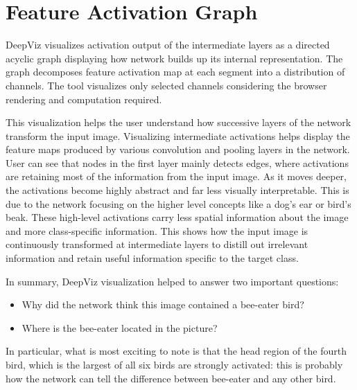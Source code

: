 \clearpage
\section*{Feature Activation Graph}

DeepViz visualizes activation output of the intermediate layers as a directed acyclic graph displaying how network builds up its internal representation. The graph decomposes feature activation map at each segment into a distribution of channels. The tool visualizes only selected channels considering the browser rendering and computation required.

This visualization helps the user understand how successive layers of the network transform the input image. Visualizing intermediate activations helps display the feature maps produced by various convolution and pooling layers in the network. User can see that nodes in the first layer mainly detects edges, where activations are retaining most of the information from the input image. As it moves deeper, the activations become highly abstract and far less visually interpretable. This is due to the network focusing on the higher level concepts like a dog's ear or bird's beak. These high-level activations carry less spatial information about the image and more class-specific information. This shows how the input image is continuously transformed at intermediate layers to distill out irrelevant information and retain useful information specific to the target class.

In summary, DeepViz visualization helped to answer two important questions:
\vspace{-1em}
\begin{itemize}
\item  Why did the network think this image contained a bee-eater bird?
\vspace{-1em}
\item Where is the bee-eater located in the picture?
\end{itemize}
\vspace{-1em}
In particular, what is most exciting to note is that the head region of the fourth bird, which is the largest of all six birds are strongly activated: this is probably how the network can tell the difference between bee-eater and any other bird.

\vspace{-1em}
